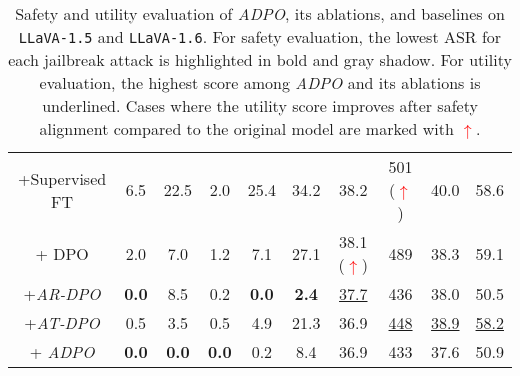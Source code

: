 \begin{table*}[ht]
{\begin{tabular}{c | c c c c c| c c c c }
    +Supervised FT& 6.5  & 22.5 & 2.0 & 25.4 & 34.2  & 38.2 & 501 (\textcolor{red}{$\uparrow$}) & 40.0 & 58.6\\

    + DPO & 2.0 & 7.0 & 1.2 & 7.1 & 27.1 & 38.1  (\textcolor{red}{$\uparrow$}) & 489  & 38.3 & 59.1\\

    +\textit{AR-DPO} & \colorbox{gray!30}{\textbf{0.0}} & 8.5 & 0.2 & \colorbox{gray!30}{\textbf{0.0}} & \colorbox{gray!30}{\textbf{2.4}} & \underline{37.7} & 436  & 38.0 & 50.5\\

    +\textit{AT-DPO} & 0.5 & 3.5 & 0.5 & 4.9 & 21.3 & 36.9  & \underline{448}& \underline{38.9} & \underline{58.2}\\

    + \textit{ADPO} & \colorbox{gray!30}{\textbf{0.0}} & \colorbox{gray!30}{\textbf{0.0}} & \colorbox{gray!30}{\textbf{0.0}} & 0.2 & 8.4 & 36.9 & 433 & 37.6 & 50.9 \\
    \hline
\end{tabular}}
\vspace{-1em}
\caption{Safety and utility evaluation of \textit{ADPO}, its ablations, and baselines on \texttt{LLaVA-1.5} and \texttt{LLaVA-1.6}. For safety evaluation, the lowest ASR for each jailbreak attack is highlighted in bold and gray shadow. For utility evaluation, the highest score among \textit{ADPO} and its ablations is underlined. Cases where the utility score improves after safety alignment compared to the original model are marked with \textcolor{red}{$\uparrow$}.}
\label{safety evaluation}
\vspace{-1em}
\end{table*}



\vspace{-0.5em}
